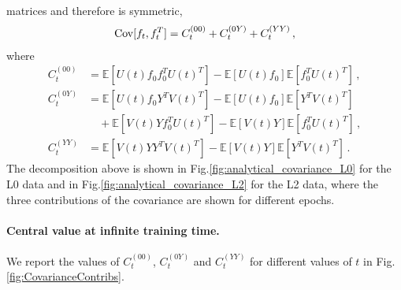 matrices and therefore is symmetric, 
\begin{align}
    \label{eq:SumOfCovariances}
    \mathrm{Cov}[f_t,f_t^T] = C_t^{(00)} + C_t^{(0Y)} + C_t^{(YY)}\, ,
\end{align}
where
\begin{align}
    \label{eq:C00term}
    C_t^{(00)} 
        &= \mathbb{E}\left[U(t) f_0 f_0^T U(t)^T\right] 
        - \mathbb{E}\left[U(t) f_0\right] \mathbb{E}\left[f_0^T U(t)^T\right]\, ,\\
    C_t^{(0Y)}
        &= \mathbb{E}\left[U(t) f_0 Y^T V(t)^T\right] 
        - \mathbb{E}\left[U(t) f_0\right] \mathbb{E}\left[Y^T V(t)^T\right] \nonumber \\
        \label{eq:C0Yterm}
        &\quad + \mathbb{E}\left[V(t) Y f_0^T U(t)^T\right]
            - \mathbb{E}\left[V(t) Y\right] \mathbb{E}\left[f_0^T U(t)^T\right] \, ,\\
    C_t^{(YY)}
        &= \mathbb{E}\left[V(t) Y Y^T V(t)^T\right]
        - \mathbb{E}\left[V(t) Y\right] \mathbb{E}\left[Y^T V(t)^T\right]\, .
\end{align}
The decomposition above is shown in Fig.\ref{fig:analytical_covariance_L0} for the L0 data and in
Fig.\ref{fig:analytical_covariance_L2} for the L2 data, where the three contributions of the covariance
are shown for different epochs.

\paragraph{Central value at infinite training time.}


We report the values of $C_t^{(00)}$, $C_t^{(0Y)}$ and $C_t^{(YY)}$ for different values of $t$ in 
Fig.\ref{fig:CovarianceContribs}.

